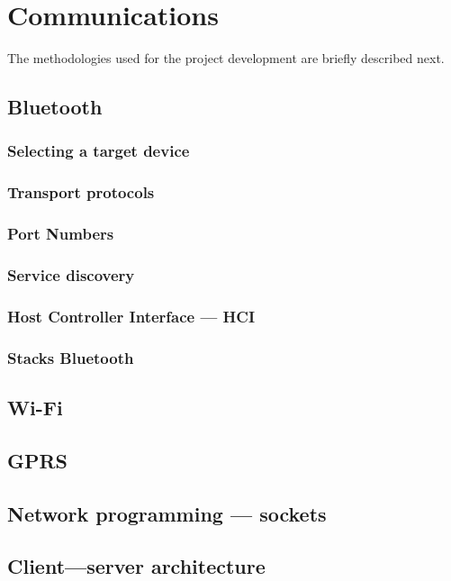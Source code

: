 \section{Communications}
The methodologies used for the project development are briefly described next.
% 
%
\subsection{Bluetooth}%
\label{sec:bluetooth}
%
\subsubsection{Selecting a target device}%
\label{sec:bt-target-device}
%
\subsubsection{Transport protocols}%
\label{sec:bt-transport-protocols}
%
\subsubsection{Port Numbers}%
\label{sec:bt-port-nrs}
%
\subsubsection{Service discovery}%
\label{sec:bt-service-discovery}
%
\subsubsection{Host Controller Interface --- HCI}%
\label{sec:bt-hci}
%
\subsubsection{Stacks Bluetooth}%
\label{sec:bt-hci}
%
\subsection{Wi-Fi}%
\label{sec:gprs}
\subsection{GPRS}%
\label{sec:gprs}
%
\subsection{Network programming --- sockets}%
\label{sec:netw-progr-sock}
%
\subsection{Client---server architecture}%
\label{sec:client-serv-arch}
